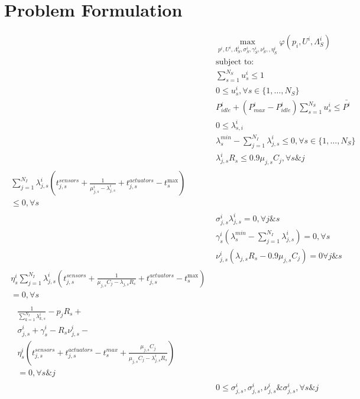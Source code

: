 \documentclass[conference]{IEEEtran}
\begin{document}
  \section{Problem Formulation}
    \begin{subequations}
      \begin{align}
        &\max_{p^i, U^i,\Lambda^i_S, \sigma_S^i, \gamma_S^i, \nu_S^i,, \eta_S^i} \varphi(p_i, U^i,\Lambda_S^i)\\
        &\text{subject to:} \nonumber\\
        &\sum_{s=1}^{N_S}u_s^i \le 1 \\
        &0 \le u_s^i, \forall s \in \{1, \hdots, N_S\} \\
        &P_{idle}^i + (P_{max}^i - P_{idle}^i)\sum_{s=1}^{N_S}u_s^i \le \bar{P^i} \\
        &0 \le \lambda_{s,i}^i \\
        &\lambda_s^{min} - \sum_{j=1}^{N_{I}} \lambda_{j,s}^i \le 0, \forall s \in \{1, \hdots, N_S\} \\
        &\lambda_{j,s}^i R_s \le 0.9 \mu_{j,s} C_j, \forall s \& j  \\
        \begin{split}
          \sum_{j=1}^{N_I} \lambda_{j,s}^i  (t^{sensors}_{j,s} + \frac{1}{\mu_{j,s}^i - \lambda_{j,s}^i} + t_{j,s}^{actuators} - t_s^{\text{max}}) \\
          \le 0, \forall s
        \end{split} \\
        &\sigma_{j,s}^i \lambda_{j,s}^i = 0, \forall j \& s\\
        &\gamma_s^i (\lambda_s^{min} - \sum_{j=1}^{N_{I}} \lambda_{j,s}^i) = 0, \forall s\\
        &\nu_{j,s}^i (\lambda_{j,s} R_s - 0.9 \mu_{j,s} C_j) = 0 \forall j \& s\\
        \begin{split}
          \eta_s^i \sum_{j=1}^{N_I} \lambda_{j,s}^i  (t^{sensors}_{j,s} + \frac{1}{\mu_{j,s} C_j - \lambda_{j,s} R_s} + t_{j,s}^{actuators} - t_s^{\text{max}}) \\
          = 0, \forall s
        \end{split} \\
        \begin{split}
          &\frac{1}{\sum_{k=1}^{N_I} \lambda_{k,s}^i} - p_j R_s + \\
          &\sigma_{j,s}^i + \gamma_s^i - R_s \nu_{j,s}^i - \\
          &\eta_s^i (t_{j,s}^{sensors} + t_{j,s}^{actuators} - t_s^{max} + \frac{\mu_{j,s} C_j}{\mu_{j,s} C_j - \lambda_{j,s}^i R_s}) \\
          & = 0, \forall s \& j
        \end{split} \\
        &0 \le \sigma_{j,s}^i, \sigma_{j,s}^i, \nu_{j,s}^i \& \sigma_{j,s}^i, \forall s \& j
      \end{align}
    \end{subequations}
\end{document}
